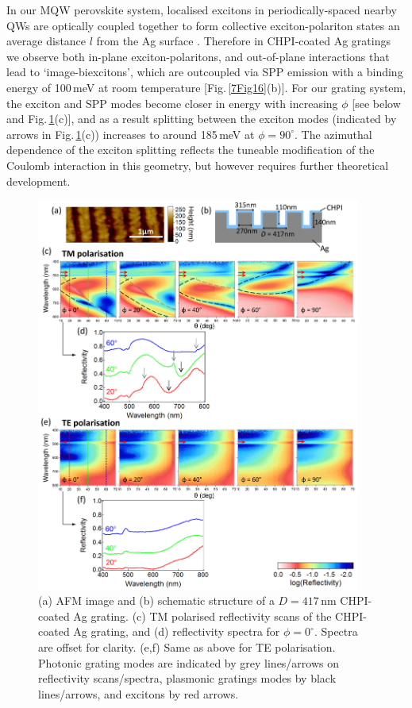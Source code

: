 In our MQW perovskite system, localised excitons in periodically-spaced nearby QWs are optically coupled together to form collective exciton-polariton states an average distance $l$ from the Ag surface \cite{Pbbr2008, Baumberg1998, Kavokin1998, Vladimirova1998}. Therefore in CHPI-coated Ag gratings we observe both in-plane exciton-polaritons, and out-of-plane interactions that lead to `image-biexcitons', which are outcoupled via SPP emission with a binding energy of 100\,meV at room temperature [Fig.\,\ref{7Fig16}(b)]. For our grating system, the exciton and SPP modes become closer in energy with increasing $\phi$ [see below and Fig.\,\ref{7Fig17}(c)], and as a result splitting between the exciton modes (indicated by arrows in Fig.\,\ref{7Fig17}(c)) increases to around 185\,meV at $\phi=90^{\circ}$. The azimuthal dependence of the exciton splitting reflects the tuneable modification of the Coulomb interaction in this geometry, but however requires further theoretical development.

\begin{figure}[h!] 
\centering    
\includegraphics[width=0.95\textwidth]{Fig17}
\caption[(a) AFM image and (b) schematic structure of $D=417$\,nm CHPI-coated Ag grating. Reflectivity measurements of CHPI-coated Ag grating in (c,d) TM and (e.f) TE polarisation.]{(a) AFM image and (b) schematic structure of a $D=417$\,nm CHPI-coated Ag grating. (c) TM polarised reflectivity scans of the CHPI-coated Ag grating, and (d) reflectivity spectra for $\phi=0^{\circ}$. Spectra are offset for clarity. (e,f) Same as above for TE polarisation. Photonic grating modes are indicated by grey lines/arrows on reflectivity scans/spectra, plasmonic gratings modes by black lines/arrows, and excitons by red arrows.}
\label{7Fig17}
\end{figure}

